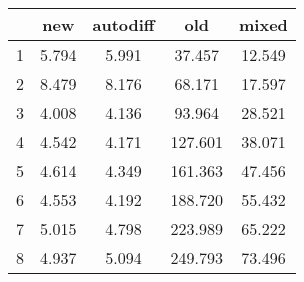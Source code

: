 \begin{tabular}{l|cccc}
\toprule
{} &   new &  autodiff &     old &  mixed \\
\midrule
1 & 5.794 &     5.991 &  37.457 & 12.549 \\
2 & 8.479 &     8.176 &  68.171 & 17.597 \\
3 & 4.008 &     4.136 &  93.964 & 28.521 \\
4 & 4.542 &     4.171 & 127.601 & 38.071 \\
5 & 4.614 &     4.349 & 161.363 & 47.456 \\
6 & 4.553 &     4.192 & 188.720 & 55.432 \\
7 & 5.015 &     4.798 & 223.989 & 65.222 \\
8 & 4.937 &     5.094 & 249.793 & 73.496 \\
\bottomrule
\end{tabular}
